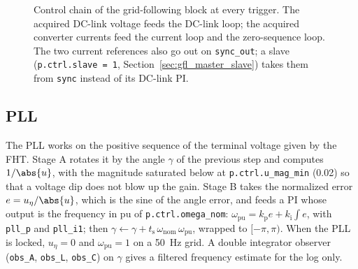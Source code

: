 \documentclass[11pt,a4paper]{scrartcl}
\newcommand{\ped}[1]{_{\mathrm{#1}}}
\newcommand{\code}[1]{\texttt{#1}}
\begin{document}
\begin{onehalfspace}
\begin{figure}[htbp]
{}
	\captionsetup{width=0.9\textwidth, font=small}
	\caption[Control chain of the grid-following block.]{Control chain of the grid-following block at every trigger. The acquired DC-link voltage feeds the DC-link loop; the acquired converter currents feed the current loop and the zero-sequence loop. The two current references also go out on \code{sync\_out}; a slave (\code{p.ctrl.slave = 1}, Section~\ref{sec:gfl_master_slave}) takes them from \code{sync} instead of its DC-link PI.}
	\label{fig:gfl_chain}
\end{figure}

\subsection{PLL}
\label{sec:pll}

The PLL works on the positive sequence of the terminal voltage given by the FHT. Stage A rotates it by the angle $\gamma$ of the previous step and computes $1/\abs{u}$, with the magnitude saturated below at \code{p.ctrl.u\_mag\_min} (0.02) so that a voltage dip does not blow up the gain. Stage B takes the normalized error $e = u_\eta/\abs{u}$, which is the sine of the angle error, and feeds a PI whose output is the frequency in pu of \code{p.ctrl.omega\_nom}: $\omega\ped{pu} = k\ped{p} e + k\ped{i} \int e$, with \code{pll\_p} and \code{pll\_i1}; then $\gamma \leftarrow \gamma + t\ped{s}\, \omega\ped{nom}\, \omega\ped{pu}$, wrapped to $[-\pi, \pi)$. When the PLL is locked, $u_\eta = 0$ and $\omega\ped{pu} = 1$ on a \SI{50}{\hertz} grid. A double integrator observer (\code{obs\_A}, \code{obs\_L}, \code{obs\_C}) on $\gamma$ gives a filtered frequency estimate for the log only.


\end{onehalfspace}
\end{document}
